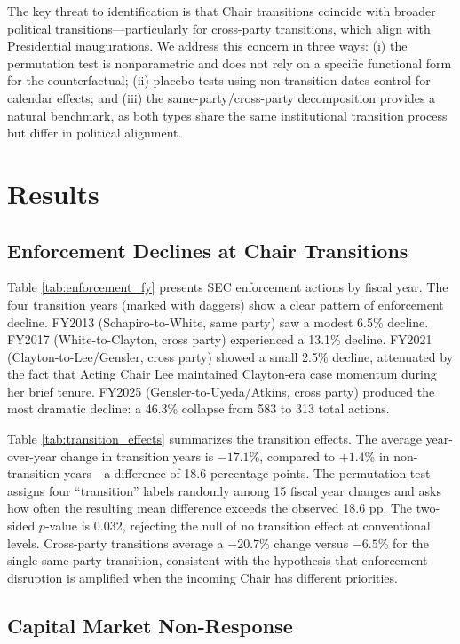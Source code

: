 \documentclass[12pt]{article}
\begin{document}
The key threat to identification is that Chair transitions coincide with broader political transitions---particularly for cross-party transitions, which align with Presidential inaugurations. We address this concern in three ways: (i) the permutation test is nonparametric and does not rely on a specific functional form for the counterfactual; (ii) placebo tests using non-transition dates control for calendar effects; and (iii) the same-party/cross-party decomposition provides a natural benchmark, as both types share the same institutional transition process but differ in political alignment.

\section{Results}

\subsection{Enforcement Declines at Chair Transitions}

Table \ref{tab:enforcement_fy} presents SEC enforcement actions by fiscal year. The four transition years (marked with daggers) show a clear pattern of enforcement decline. FY2013 (Schapiro-to-White, same party) saw a modest 6.5\% decline. FY2017 (White-to-Clayton, cross party) experienced a 13.1\% decline. FY2021 (Clayton-to-Lee/Gensler, cross party) showed a small 2.5\% decline, attenuated by the fact that Acting Chair Lee maintained Clayton-era case momentum during her brief tenure. FY2025 (Gensler-to-Uyeda/Atkins, cross party) produced the most dramatic decline: a 46.3\% collapse from 583 to 313 total actions.

Table \ref{tab:transition_effects} summarizes the transition effects. The average year-over-year change in transition years is $-17.1$\%, compared to $+1.4$\% in non-transition years---a difference of 18.6 percentage points. The permutation test assigns four ``transition'' labels randomly among 15 fiscal year changes and asks how often the resulting mean difference exceeds the observed 18.6 pp. The two-sided $p$-value is 0.032, rejecting the null of no transition effect at conventional levels. Cross-party transitions average a $-20.7$\% change versus $-6.5$\% for the single same-party transition, consistent with the hypothesis that enforcement disruption is amplified when the incoming Chair has different priorities.

\subsection{Capital Market Non-Response}
\end{document}
